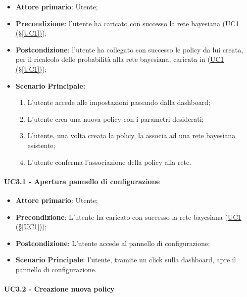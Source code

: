 \begin{itemize}
	\item \textbf{Attore primario}: Utente; 
	\item \textbf{Precondizione}: l'utente ha caricato con successo la rete bayesiana (\hyperref[UC1]{UC1 (§\ref*{UC1})});
	\item \textbf{Postcondizione}: l'utente ha collegato con successo le policy da lui creata, per il ricalcolo delle probabilità alla rete bayesiana, caricata in (\hyperref[UC1]{UC1 (§\ref*{UC1})});	
	\item \textbf{Scenario Principale:}

	\begin{enumerate}
		\item L'utente accede alle impostazioni passando dalla dashboard;
		\item L'utente crea una nuova policy con i parametri desiderati; 
		\item L'utente, una volta creata la policy, la associa  ad una rete bayesiana esistente;
		\item L'utente conferma l'associazione della policy alla rete.
	\end{enumerate}
	
\end{itemize}

\paragraph{UC3.1 - Apertura pannello di configurazione}\label{UC3.1}
\begin{itemize}
	\item \textbf{Attore primario}: Utente; 
	\item \textbf{Precondizione}: L'utente ha caricato con successo la rete bayesiana (\hyperref[UC1]{UC1 (§\ref*{UC1})});
	\item \textbf{Postcondizione}: L'utente accede al pannello di configurazione;
	\item \textbf{Scenario Principale}: l'utente, tramite un click sulla dashboard, apre il pannello di configurazione. 
\end{itemize}

\paragraph{UC3.2 - Creazione nuova policy}\label{UC3.2}

